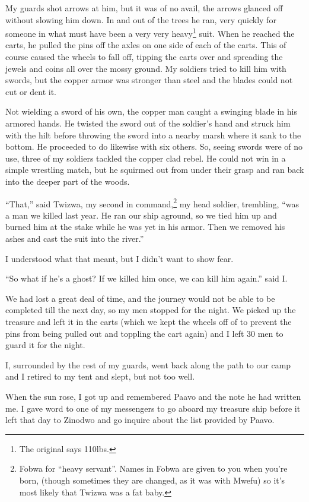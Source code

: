 My guards shot arrows at him, but it was of no avail, the arrows glanced off without slowing him down. In and out of the trees he ran, very quickly for someone in what must have been a very very heavy\footnote{The original says 110lbs.} suit. When he reached the carts, he pulled the pins off the axles on one side of each of the carts. This of course caused the wheels to fall off, tipping the carts over and spreading the jewels and coins all over the mossy ground. My soldiers tried to kill him with swords, but the copper armor was stronger than steel and the blades could not cut or dent it. 

Not wielding a sword of his own, the copper man caught a swinging blade in his armored hands. He twisted the sword out of the soldier's hand and struck him with the hilt before throwing the sword into a nearby marsh where it sank to the bottom. He proceeded to do likewise with six others. So, seeing swords were of no use, three of my soldiers tackled the copper clad rebel. He could not win in a simple wrestling match, but he squirmed out from under their grasp and ran back into the deeper part of the woods.

``That,'' said Twi\-zwa, my second in command,\footnote{Fo\-bwa for ``heavy servant''. Names in Fo\-bwa are given to you when you're born, (though sometimes they are changed, as it was with Mwe\-fu) so it's most likely that Twi\-zwa was a fat baby.} my head soldier, trembling, ``was a man we killed last year. He ran our ship aground, so we tied him up and burned him at the stake while he was yet in his armor. Then we removed his ashes and cast the suit into the river.''

I understood what that meant, but I didn't want to show fear.

``So what if he's a ghost? If we killed him once, we can kill him again.'' said I.

We had lost a great deal of time, and the journey would not be able to be completed till the next day, so my men stopped for the night.
We picked up the treasure and left it in the carts (which we kept the wheels off of to prevent the pins from being pulled out and toppling the cart again) and I left 30 men to guard it for the night.

I, surrounded by the rest of my guards, went back along the path to our camp and I retired to my tent and slept, but not too well.

\tbreak

When the sun rose, I got up and remembered Paa\-vo and the note he had written me.
I gave word to one of my messengers to go aboard my treasure ship before it left that day to Zi\-no\-dwo and go inquire about the list provided by Paa\-vo. 

